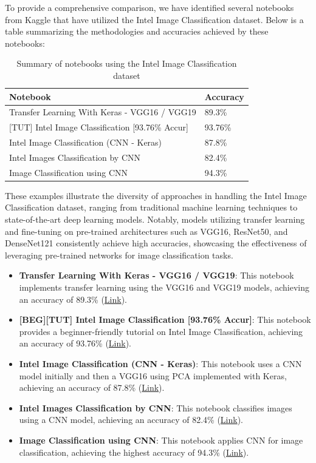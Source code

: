 \documentclass[conference]{IEEEtran}
\begin{document}
To provide a comprehensive comparison, we have identified several notebooks from Kaggle that have utilized the Intel Image Classification dataset. Below is a table summarizing the methodologies and accuracies achieved by these notebooks:

\begin{table}[h]
\centering
\begin{tabular}{|l|l|}
\hline
\textbf{Notebook} & \textbf{Accuracy} \\ \hline
Transfer Learning With Keras - VGG16 / VGG19 & 89.3\% \\ \hline
[BEG][TUT] Intel Image Classification [93.76\% Accur] & 93.76\% \\ \hline
Intel Image Classification (CNN - Keras) & 87.8\% \\ \hline
Intel Images Classification by CNN & 82.4\% \\ \hline
Image Classification using CNN & 94.3\% \\ \hline
\end{tabular}
\caption{Summary of notebooks using the Intel Image Classification dataset}
\label{table}
\end{table}

These examples illustrate the diversity of approaches in handling the Intel Image Classification dataset, ranging from traditional machine learning techniques to state-of-the-art deep learning models. Notably, models utilizing transfer learning and fine-tuning on pre-trained architectures such as VGG16, ResNet50, and DenseNet121 consistently achieve high accuracies, showcasing the effectiveness of leveraging pre-trained networks for image classification tasks.

\begin{itemize}
    \item \textbf{Transfer Learning With Keras - VGG16 / VGG19}: This notebook implements transfer learning using the VGG16 and VGG19 models, achieving an accuracy of 89.3\% (\href{https://www.kaggle.com/code/ihsncnkz/transfer-learning-with-keras-vgg16-vgg19}{Link}).
    \item \textbf{[BEG][TUT] Intel Image Classification [93.76\% Accur]}: This notebook provides a beginner-friendly tutorial on Intel Image Classification, achieving an accuracy of 93.76\% (\href{https://www.kaggle.com/code/uzairrj/beg-tut-intel-image-classification-93-76-accur}{Link}).
    \item \textbf{Intel Image Classification (CNN - Keras)}: This notebook uses a CNN model initially and then a VGG16 using PCA implemented with Keras, achieving an accuracy of 87.8\% (\href{https://www.kaggle.com/code/vincee/intel-image-classification-cnn-keras}{Link}).
    \item \textbf{Intel Images Classification by CNN}: This notebook classifies images using a CNN model, achieving an accuracy of 82.4\% (\href{https://www.kaggle.com/code/bibo600/intel-images-classification-by-cnn}{Link}).
    \item \textbf{Image Classification using CNN}: This notebook applies CNN for image classification, achieving the highest accuracy of 94.3\% (\href{https://www.kaggle.com/code/madhumithakolkar/image-classification-using-cnn}{Link}).
\end{itemize}
\end{document}
